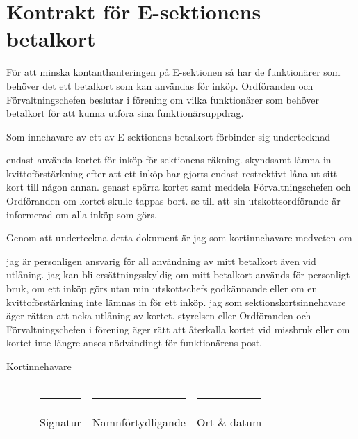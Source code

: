 \documentclass[10pt]{article}
\def\doctitle{Kontrakt för E-sektionens betalkort}
\begin{document}
\section*{\doctitle}

För att minska kontanthanteringen på E-sektionen så har de funktionärer som behöver det ett betalkort som kan användas för inköp. Ordföranden och Förvaltningschefen beslutar i förening om vilka funktionärer som behöver betalkort för att kunna utföra sina funktionärsuppdrag.

Som innehavare av ett av E-sektionens betalkort förbinder sig undertecknad

\begin{attsatser}
\att endast använda kortet för inköp för sektionens räkning.
\att skyndsamt lämna in kvittoförstärkning efter att ett inköp har gjorts
\att endast restrektivt låna ut sitt kort till någon annan.
\att genast spärra kortet samt meddela Förvaltningschefen och Ordföranden om kortet skulle tappas bort.
\att se till att sin utskottsordförande är informerad om alla inköp som görs.
\end{attsatser}

Genom att underteckna detta dokument är jag som kortinnehavare medveten om
\begin{attsatser}
\att jag är personligen ansvarig för all användning av mitt betalkort även vid utlåning.
\att jag kan bli ersättningsskyldig om mitt betalkort används för personligt bruk, om ett inköp görs utan min utskottschefs godkännande eller om en kvittoförstärkning inte lämnas in för ett inköp.
\att jag som sektionskortsinnehavare äger rätten att neka utlåning av kortet.
\att styrelsen eller Ordföranden och Förvaltningschefen i förening äger rätt att återkalla kortet vid missbruk eller om kortet inte längre anses nödvändingt för funktionärens post.
\end{attsatser}

\vspace*{\fill}
Kortinnehavare
\vspace*{10mm}
\begin{figure}[H]
\begin{tabularx}{\textwidth}{p{} p{} p{}}
    \rule{0.3\textwidth}{0.4pt} &
    \rule{0.3\textwidth}{0.4pt} &
    \rule{0.3\textwidth}{0.4pt} \\
    Signatur &
    Namnförtydligande &
    Ort \& datum \\
\end{tabularx}
\end{figure}
\end{document}
